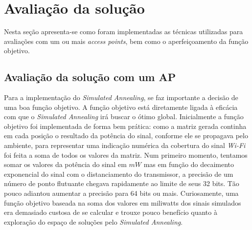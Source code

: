 \documentclass[
	12pt,				%
	twoside,			%
	a4paper,			%
	english,			%
	french,				%
	spanish,			%
	brazil				%
	]{abntex2}
\begin{document}
\section{Avaliação da solução}\label{avaliauxe7uxe3o-da-soluuxe7uxe3o}

Nesta seção apresenta-se como foram implementadas as técnicas utilizadas
para avaliações com um ou mais \emph{access points}, bem como o
aperfeiçoamento da função objetivo.

\subsection{Avaliação da solução com um AP}\label{sec:avalia_one_ap}

Para a implementação do \emph{Simulated Annealing}, se faz importante a
decisão de uma boa função objetivo. A função objetivo está diretamente
ligada à eficácia com que o \emph{Simulated Annealing} irá buscar o
ótimo global. Inicialmente a função objetivo foi implementada de forma
bem prática: como a matriz gerada continha em cada posição o resultado
da potência do sinal, conforme ele se propagava pelo ambiente, para
representar uma indicação numérica da cobertura do sinal \emph{Wi-Fi}
foi feita a soma de todos os valores da matriz. Num primeiro momento,
tentamos somar os valores da potência do sinal em \(mW\) mas em função
do decaimento exponencial do sinal com o distanciamento do transmissor,
a precisão de um número de ponto flutuante chegava rapidamente ao limite
de seus 32 bits. Tão pouco adiantou aumentar a precisão para 64 bits ou
mais. Curiosamente, uma função objetivo baseada na soma dos valores em
miliwatts dos sinais simulados era demasiado custosa de se calcular e
trouxe pouco benefício quanto à exploração do espaço de soluções pelo
\emph{Simulated Annealing}.
\end{document}
